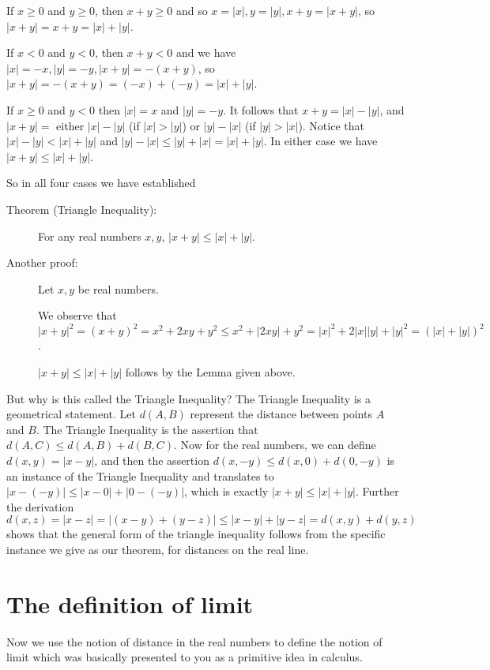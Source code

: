 \documentclass[12pt]{article}
\begin{document}
If $x\geq 0$ and $y\geq 0$, then $x+y\geq 0$ and so $x=|x|, y=|y|,x+y=|x+y|$, so $|x+y| = x+y = |x|+|y|$.

If $x<0$ and $y<0$, then $x+y<0$ and we have $|x|=-x, |y|=-y, |x+y| = -(x+y)$, so $|x+y| = -(x+y) = (-x)+(-y) = |x|+|y|$.

If $x\geq 0$ and $y<0$ then $|x|=x$ and $|y| = -y$.  It follows that $x+y = |x|-|y|$, and $|x+y|= $ either
$|x|-|y|$ (if $|x|>|y|$) or $|y|-|x|$ (if $|y|>|x|$).  Notice that $|x|-|y|<|x|+|y|$ and $|y|-|x|\leq |y|+|x| = |x|+|y|$.
In either case we have $|x+y| \leq |x|+|y|$.

So in all four cases we have established

\begin{description}

\item[Theorem (Triangle Inequality):]  For any real numbers $x,y$, $|x+y| \leq |x|+|y|$.

\item[Another proof:]  Let $x,y$ be real numbers.

We observe that $|x+y|^2 = (x+y)^2 = x^2+2xy+y^2 \leq x^2+|2xy|+y^2 = |x|^2+2|x||y|+|y|^2 = (|x|+|y|)^2$.

$|x+y| \leq |x|+|y|$ follows by the Lemma given above.


\end{description}

But why is this called the Triangle Inequality?  The Triangle Inequality is a geometrical statement.  Let $d(A,B)$ represent the distance between points $A$ and $B$.  The Triangle Inequality is the assertion that $d(A,C) \leq d(A,B) + d(B,C)$.  Now for the real numbers, we can define $d(x,y) = |x-y|$, and then the assertion $d(x,-y) \leq d(x,0) + d(0,-y)$ is an instance of the Triangle Inequality and translates to $|x-(-y)| \leq |x-0|+|0-(-y)|$, which is exactly 
$|x+y| \leq |x|+|y|$.   Further the derivation $d(x,z) = |x-z| = |(x-y)+(y-z)| \leq |x-y| + |y-z| = d(x,y) + d(y,z)$ shows that the general form of the triangle inequality follows from the specific instance we give as our theorem, for distances on the real line.

\newpage

\section{The definition of limit}

Now we use the notion of distance in the real numbers to define the notion of limit which was basically presented to you as a primitive idea in calculus.
\end{document}
